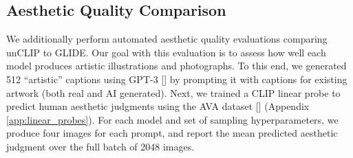 \documentclass{article}
\newcommand{\shortcite}[1]{[\citenum{#1}]}
\newcommand{\modelname}{unCLIP}
\begin{document}
\subsection{Aesthetic Quality Comparison}
\label{sec:aesthetic}

We additionally perform automated aesthetic quality evaluations comparing \modelname{} to GLIDE. Our goal with this evaluation is to assess how well each model produces artistic illustrations and photographs. To this end, we generated 512 ``artistic'' captions using GPT-3 \shortcite{gpt3} by prompting it with captions for existing artwork (both real and AI generated). Next, we trained a CLIP linear probe to predict human aesthetic judgments using the AVA dataset \shortcite{avadataset} (Appendix \ref{app:linear_probes}). For each model and set of sampling hyperparameters, we produce four images for each prompt, and report the mean predicted aesthetic judgment over the full batch of 2048 images.
\end{document}

